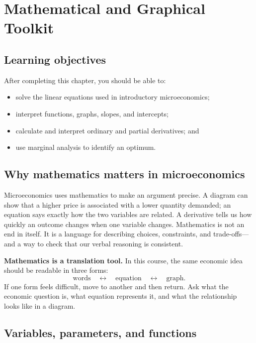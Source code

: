 \chapter{Mathematical and Graphical Toolkit}
\label{chap:maths}

\section{Learning objectives}

After completing this chapter, you should be able to:
\begin{itemize}
  \item solve the linear equations used in introductory microeconomics;
  \item interpret functions, graphs, slopes, and intercepts;
  \item calculate and interpret ordinary and partial derivatives; and
  \item use marginal analysis to identify an optimum.
\end{itemize}

\section{Why mathematics matters in microeconomics}

Microeconomics uses mathematics to make an argument precise. A diagram can
show that a higher price is associated with a lower quantity demanded; an
equation says exactly how the two variables are related. A derivative tells us
how quickly an outcome changes when one variable changes. Mathematics is not
an end in itself. It is a language for describing choices, constraints, and
trade-offs---and a way to check that our verbal reasoning is consistent.

\begin{keyidea}
\textbf{Mathematics is a translation tool.} In this course, the same economic
idea should be readable in three forms:
\[
\text{words} \quad \longleftrightarrow \quad \text{equation}
\quad \longleftrightarrow \quad \text{graph}.
\]
If one form feels difficult, move to another and then return. Ask what the
economic question is, what equation represents it, and what the relationship
looks like in a diagram.
\end{keyidea}

\section{Variables, parameters, and functions}

